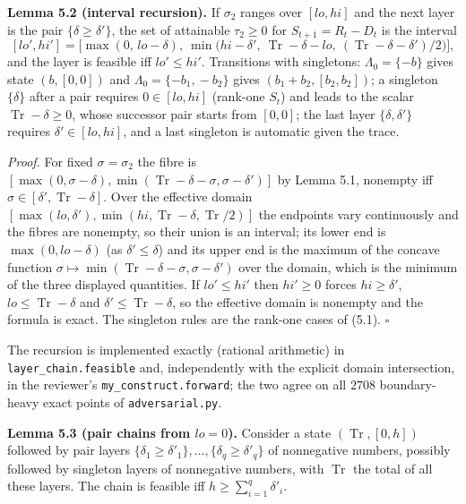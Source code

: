 \documentclass[
  11pt,
  a4paper,
]{article}
\newcounter{none} %
\begin{document}
\textbf{Lemma 5.2 (interval recursion).} If \(\sigma_2\) ranges over
\([lo,\allowbreak{}hi]\) and the next layer is the pair \(\{\delta\ge\delta'\}\), the
set of attainable \(\tau_2\ge0\) for \(S_{t+1}=R_t-D_t\) is the interval
\[[lo',hi']=\Big[\max(0,\,lo-\delta),\ \min\big(hi-\delta',\ \operatorname{Tr}-\delta-lo,\ (\operatorname{Tr}-\delta-\delta')/2\big)\Big],\]
and the layer is feasible iff \(lo'\le hi'\). Transitions with
singletons: \(\Lambda_0=\{-b\}\) gives state \((b,\allowbreak{}[0,\allowbreak{}0])\) and
\(\Lambda_0=\{-b_1,\allowbreak{}-b_2\}\) gives \((b_1+b_2,\allowbreak{}[b_2,\allowbreak{}b_2])\); a singleton
\(\{\delta\}\) after a pair requires \(0\in[lo,\allowbreak{}hi]\) (rank-one \(S_t\))
and leads to the scalar \(\operatorname{Tr}-\delta\ge0\), whose
successor pair starts from \([0,\allowbreak{}0]\); the last layer
\(\{\delta,\allowbreak{}\delta'\}\) requires \(\delta'\in[lo,\allowbreak{}hi]\), and a last
singleton is automatic given the trace.

\emph{Proof.} For fixed \(\sigma=\sigma_2\) the fibre is
\([\max(0,\allowbreak{}\sigma-\delta),\allowbreak{}\min(\operatorname{Tr}-\delta-\sigma,\allowbreak{}\sigma-\delta')]\)
by Lemma 5.1, nonempty iff
\(\sigma\in[\delta',\allowbreak{}\operatorname{Tr}-\delta]\). Over the effective
domain
\([\max(lo,\allowbreak{}\delta'),\allowbreak{}\min(hi,\allowbreak{}\operatorname{Tr}-\delta,\allowbreak{}\operatorname{Tr}/2)]\)
the endpoints vary continuously and the fibres are nonempty, so their
union is an interval; its lower end is \(\max(0,\allowbreak{}lo-\delta)\) (as
\(\delta'\le\delta\)) and its upper end is the maximum of the concave
function
\(\sigma\mapsto\min(\operatorname{Tr}-\delta-\sigma,\allowbreak{}\sigma-\delta')\)
over the domain, which is the minimum of the three displayed quantities.
If \(lo'\le hi'\) then \(hi'\ge0\) forces \(hi\ge\delta'\),
\(lo\le\operatorname{Tr}-\delta\) and
\(\delta'\le\operatorname{Tr}-\delta\), so the effective domain is
nonempty and the formula is exact. The singleton rules are the rank-one
cases of (5.1). \(\square\)

The recursion is implemented exactly (rational arithmetic) in
{\small\texttt{layer\_\allowbreak{}chain.\allowbreak{}feasible}} and, independently with the explicit
domain intersection, in the reviewer's {\small\texttt{my\_\allowbreak{}construct.\allowbreak{}forward}};
the two agree on all \(2708\) boundary-heavy exact points of
{\small\texttt{adversarial.\allowbreak{}py}}.

\textbf{Lemma 5.3 (pair chains from \(lo=0\)).} Consider a state
\((\operatorname{Tr},\allowbreak{}[0,\allowbreak{}h])\) followed by pair layers
\(\{\delta_1\ge\delta'_1\},\allowbreak{}\dots,\allowbreak{}\{\delta_q\ge\delta'_q\}\) of
nonnegative numbers, possibly followed by singleton layers of
nonnegative numbers, with \(\operatorname{Tr}\) the total of all these
layers. The chain is feasible iff \(h\ge\sum_{i=1}^q\delta'_i\).
\end{document}
